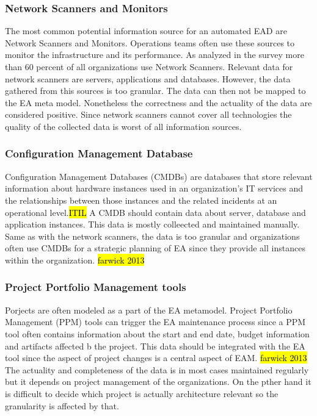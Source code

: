 \subsubsection{Network Scanners and Monitors}
The most common potential information source for an automated EAD are Network Scanners and Monitors. Operations teams often use these sources to monitor the infrastructure and its performance. As analyzed in the survey more than 60 percent of all organizations use Network Scanners.
Relevant data for network scanners are servers, applications and databases. However, the data gathered from this sources is too granular. The data can then not be mapped to the EA meta model. Nonetheless the correctness and the actuality of the data are considered positive. Since network scanners cannot cover all technologies the quality  of the collected data is worst of all information sources.

\subsubsection{Configuration Management Database}
Configuration Management Databases (CMDBs) are databases that store relevant information about hardware instances used in an organization's IT services and the relationships between those instances and the related incidents at an operational level.\hl{ITIL}
A CMDB should contain data about server, database and application instances. This data is mostly colleected and maintained manually. Same as with the network scanners, the data is too granular and organizations often use CMDBs for a strategic planning of EA since they provide all instances within the organization. \hl{farwick 2013}

\subsubsection{Project Portfolio Management tools}
Porjects are often modeled as a part of the EA metamodel. Project Portfolio Management (PPM) tools can trigger the EA maintenance process since a PPM tool often contains information about the start and end date, budget information and artifacts affected b the project. This data should be integrated with the EA tool since the aspect of project changes is a central aspect of EAM. \hl{farwick 2013}
The actuality and completeness of the data is in most cases maintained regularly but it depends on project management of the organizations. On the pther hand it is difficult to decide which project is actually architecture relevant so the granularity is affected by that.

